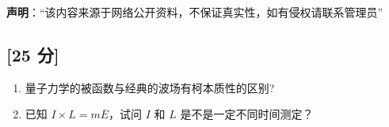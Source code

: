
\textbf{声明}：“该内容来源于网络公开资料，不保证真实性，如有侵权请联系管理员”

\subsection{[25 分]}
\begin{enumerate}
\item 量子力学的被函数与经典的波场有柯本质性的区别?
\item 已知 $I \times L = m \overline{E}$，试问 $I$ 和 $L$ 是不是一定不同时间测定？
\end{enumerate}

